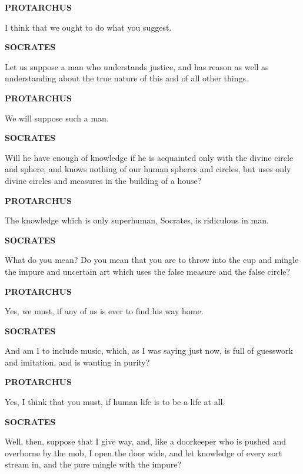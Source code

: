 \documentclass[11pt,letter]{article}
\begin{document}
\par \textbf{PROTARCHUS}
\par   I think that we ought to do what you suggest.

\par \textbf{SOCRATES}
\par   Let us suppose a man who understands justice, and has reason as well as understanding about the true nature of this and of all other things.

\par \textbf{PROTARCHUS}
\par   We will suppose such a man.

\par \textbf{SOCRATES}
\par   Will he have enough of knowledge if he is acquainted only with the divine circle and sphere, and knows nothing of our human spheres and circles, but uses only divine circles and measures in the building of a house?

\par \textbf{PROTARCHUS}
\par   The knowledge which is only superhuman, Socrates, is ridiculous in man.

\par \textbf{SOCRATES}
\par   What do you mean? Do you mean that you are to throw into the cup and mingle the impure and uncertain art which uses the false measure and the false circle?

\par \textbf{PROTARCHUS}
\par   Yes, we must, if any of us is ever to find his way home.

\par \textbf{SOCRATES}
\par   And am I to include music, which, as I was saying just now, is full of guesswork and imitation, and is wanting in purity?

\par \textbf{PROTARCHUS}
\par   Yes, I think that you must, if human life is to be a life at all.

\par \textbf{SOCRATES}
\par   Well, then, suppose that I give way, and, like a doorkeeper who is pushed and overborne by the mob, I open the door wide, and let knowledge of every sort stream in, and the pure mingle with the impure?
\end{document}
